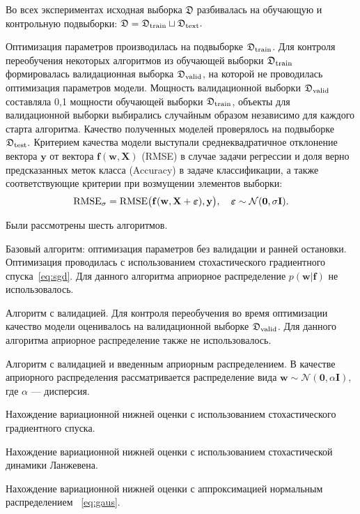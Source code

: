 \documentclass[12pt]{a&t}
\begin{document}
Во всех экспериментах исходная выборка $\mathfrak{D}$ разбивалась на обучающую и контрольную подвыборки:
$
	\mathfrak{D} = \mathfrak{D}_\textnormal{train} \sqcup \mathfrak{D}_\textnormal{text}.
$

Оптимизация параметров производилась на подвыборке $\mathfrak{D}_\textnormal{train}$. Для контроля переобучения некоторых алгоритмов из обучающей выборки $\mathfrak{D}_\textnormal{train}$ формировалась валидационная выборка $\mathfrak{D}_\textnormal{valid}$, на которой не проводилась оптимизация параметров  модели. Мощность валидационной выборки $\mathfrak{D}_\textnormal{valid}$ составляла 0,1 мощности обучающей выборки  $\mathfrak{D}_\textnormal{train}$, объекты для валидационной выборки выбирались случайным образом независимо для каждого старта алгоритма.
Качество полученных моделей проверялось на подвыборке $\mathfrak{D}_\textnormal{test}.$ Критерием качества модели выступали среднеквадратичное отклонение вектора $\mathbf{y}$ от вектора $\mathbf{f}(\mathbf{w}, \mathbf{X})$ (RMSE) {в случае задачи регрессии и доля верно предсказанных меток класса (Accuracy) в задаче классификации}, а также { соответствующие критерии } при возмущении элементов выборки:
\begin{equation}
\label{eq:rmse}
	\textnormal{RMSE}_{\sigma} =\textnormal{RMSE}\bigl(\mathbf{f}( \mathbf{w}, \mathbf{X}+\boldsymbol{\varepsilon}), \mathbf{y}\bigr),  \quad \boldsymbol{\varepsilon} \sim \mathcal{N}(\mathbf{0}, \sigma \mathbf{I}).
\end{equation}

Были рассмотрены шесть алгоритмов.
\begin{enumlist}[.]%
\item Базовый алгоритм: оптимизация параметров без валидации и ранней остановки. Оптимизация проводилась с использованием стохастического градиентного спуска~\eqref{eq:sgd}. Для данного алгоритма априорное распределение $p(\mathbf{w}|\mathbf{f})$ не использовалось.
\item Алгоритм с валидацией. Для контроля переобучения во время оптимизации качество модели оценивалось на валидационной выборке $\mathfrak{D}_\textnormal{valid}$. Для данного алгоритма априорное распределение также не использовалось.
\item Алгоритм с валидацией и введенным априорным распределением. В качестве априорного распределения рассматривается распределение вида
$
	\mathbf{w} \sim \mathcal{N}(\mathbf{0}, \alpha \mathbf{I}), 
$
где $\alpha$ --- дисперсия.

\item Нахождение вариационной нижней оценки с использованием стохастического градиентного спуска.
\item Нахождение вариационной нижней оценки с использованием стохастической динамики Ланжевена.
\item Нахождение вариационной нижней оценки с аппроксимацией нормальным распределением ~\eqref{eq:gaus}.
\end{enumlist}
\end{document}
